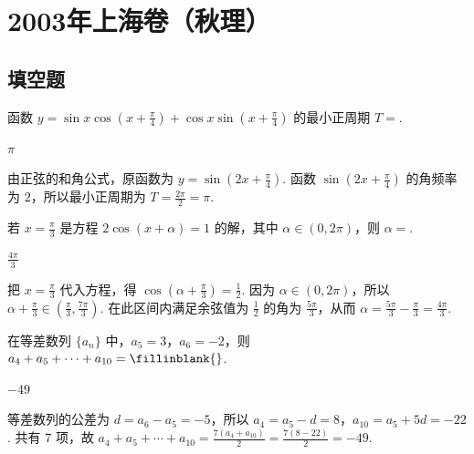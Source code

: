 \chapter{2003年上海卷（秋理）}
\section{填空题}
\begin{problem}
函数 \( y = \sin x \cos \left( x + \frac{\pi}{4} \right) + \cos x \sin \left( x + \frac{\pi}{4} \right) \) 的最小正周期 \( T = \)\fillinblank{}.
\end{problem}

\begin{answer}
\(\pi\)
\end{answer}

\begin{solution}
由正弦的和角公式，原函数为 \(y=\sin\left(2x+\frac{\pi}{4}\right)\). 函数 \(\sin(2x+\frac{\pi}{4})\) 的角频率为 \(2\)，所以最小正周期为 \(T=\frac{2\pi}{2}=\pi\).
\end{solution}

\begin{problem}
若 \(x = \frac{\pi}{3}\) 是方程 \(2\cos (x + \alpha) = 1\) 的解，其中 \(\alpha \in \left(0, 2\pi\right)\)，则 \(\alpha = \)\fillinblank{}.
\end{problem}

\begin{answer}
\(\frac{4\pi}{3}\)
\end{answer}

\begin{solution}
把 \(x=\frac{\pi}{3}\) 代入方程，得 \(\cos\left(\alpha+\frac{\pi}{3}\right)=\frac{1}{2}\). 因为 \(\alpha\in(0,2\pi)\)，所以 \(\alpha+\frac{\pi}{3}\in\left(\frac{\pi}{3},\frac{7\pi}{3}\right)\). 在此区间内满足余弦值为 \(\frac{1}{2}\) 的角为 \(\frac{5\pi}{3}\)，从而 \(\alpha=\frac{5\pi}{3}-\frac{\pi}{3}=\frac{4\pi}{3}\).
\end{solution}

\begin{problem}
在等差数列 \(\{a_{n}\}\) 中，\(a_{5} = 3\)，\(a_{6} = -2\)，则 \(a_{4} + a_{5} + \cdots + a_{10} =\fillinblank{}\).
\end{problem}

\begin{answer}
\(-49\)
\end{answer}

\begin{solution}
等差数列的公差为 \(d=a_{6}-a_{5}=-5\)，所以 \(a_{4}=a_{5}-d=8\)，\(a_{10}=a_{5}+5d=-22\). 共有 \(7\) 项，故 \(a_{4}+a_{5}+\cdots+a_{10}=\frac{7(a_{4}+a_{10})}{2}=\frac{7(8-22)}{2}=-49\).
\end{solution}

